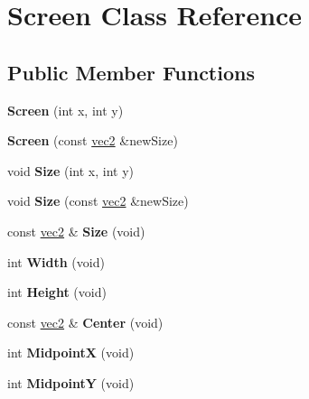 \hypertarget{class_screen}{\section{Screen Class Reference}
\label{class_screen}
}
\subsection*{Public Member Functions}
\begin{DoxyCompactItemize}
\item 
\hypertarget{class_screen_ad664ad8b3ba858a4b9a3798cd2a0e295}{{\bfseries Screen} (int x, int y)}\label{class_screen_ad664ad8b3ba858a4b9a3798cd2a0e295}

\item 
\hypertarget{class_screen_a7b45282430392ffa8b5891936363f8f8}{{\bfseries Screen} (const \hyperlink{struct_angel_1_1vec2}{vec2} \&new\-Size)}\label{class_screen_a7b45282430392ffa8b5891936363f8f8}

\item 
\hypertarget{class_screen_a478c5176fd4fdc8af48f2bd7e824329d}{void {\bfseries Size} (int x, int y)}\label{class_screen_a478c5176fd4fdc8af48f2bd7e824329d}

\item 
\hypertarget{class_screen_a5fa4071af08df619e7cb4311bc0efb45}{void {\bfseries Size} (const \hyperlink{struct_angel_1_1vec2}{vec2} \&new\-Size)}\label{class_screen_a5fa4071af08df619e7cb4311bc0efb45}

\item 
\hypertarget{class_screen_a6f22423a037d9cf406d3ca4dd79b94b5}{const \hyperlink{struct_angel_1_1vec2}{vec2} \& {\bfseries Size} (void)}\label{class_screen_a6f22423a037d9cf406d3ca4dd79b94b5}

\item 
\hypertarget{class_screen_aa9a4a2e113af54d7164463bef8e78471}{int {\bfseries Width} (void)}\label{class_screen_aa9a4a2e113af54d7164463bef8e78471}

\item 
\hypertarget{class_screen_ad532ef57bbdb9a1e1540812a02eece23}{int {\bfseries Height} (void)}\label{class_screen_ad532ef57bbdb9a1e1540812a02eece23}

\item 
\hypertarget{class_screen_a00be376c569ac4b71d770f34e297f332}{const \hyperlink{struct_angel_1_1vec2}{vec2} \& {\bfseries Center} (void)}\label{class_screen_a00be376c569ac4b71d770f34e297f332}

\item 
\hypertarget{class_screen_a434f489a1b9d40319f7f6dbbf11db456}{int {\bfseries Midpoint\-X} (void)}\label{class_screen_a434f489a1b9d40319f7f6dbbf11db456}

\item 
\hypertarget{class_screen_a7b574e8ded50718dc1523180102e2f41}{int {\bfseries Midpoint\-Y} (void)}\label{class_screen_a7b574e8ded50718dc1523180102e2f41}

\end{DoxyCompactItemize}

